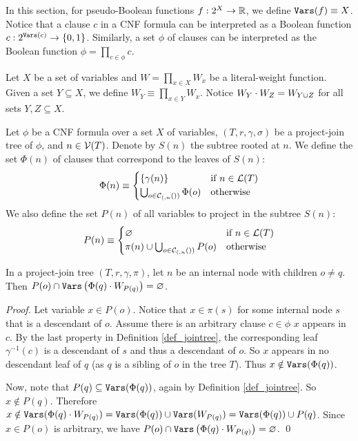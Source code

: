 In this section, for pseudo-Boolean functions $f : 2^X \to \mathbb{R}$, we define $\texttt{\upshape Vars}(f) \equiv X$.
Notice that a clause $c$ in a CNF formula can be interpreted as a Boolean function $c : 2^{\texttt{\upshape Vars}(c)} \to \left\{ 0, 1 \right\}$.
Similarly, a set $\phi$ of clauses can be interpreted as the Boolean function $\phi = \prod_{c \in \phi} c$.

Let $X$ be a set of variables and $W = \prod_{x \in X} W_x$ be a literal-weight function.
Given a set $Y \subseteq X$, we define $W_{Y} \equiv \prod_{x \in Y} W_x$.
Notice $W_Y \cdot W_Z = W_{Y \cup Z}$ for all sets $Y, Z \subseteq X$.

Let $\phi$ be a CNF formula over a set $X$ of variables, $(T, r, \gamma, \sigma)$ be a project-join tree of $\phi$, and $n \in \mathcal{V}(T)$.
Denote by $S(n)$ the subtree rooted at $n$.
We define the set $\Phi(n)$ of clauses that correspond to the leaves of $S(n)$:
\begin{align*}
    \Phi(n) \equiv
    \begin{cases}
        \left\{ \gamma(n) \right\} & \text{if } n \in \mathcal{L}(T) \\
        \bigcup_{o \in \mathcal{C}_{(,n}())} \Phi(o) & \text{otherwise}
    \end{cases}
\end{align*}
We also define the set $P(n)$ of all variables to project in the subtree $S(n)$:
\begin{align*}
    P(n) \equiv
    \begin{cases}
       \varnothing & \text{if } n \in \mathcal{L}(T) \\
        \pi(n) \cup \bigcup_{o \in \mathcal{C}_{(,n}())} P(o) & \text{otherwise}
    \end{cases}
\end{align*}

\begin{lemma}
\label{lemma_disjoint_P}
    In a project-join tree $(T, r, \gamma, \pi)$, let $n$ be an internal node with children $o \ne q$.
    Then $P(o) \cap \texttt{\upshape Vars} \left( \Phi(q) \cdot W_{P(q)} \right) = \varnothing$.
\end{lemma}
\begin{proof}
    Let variable $x \in P(o)$.
    Notice that $x \in \pi(s)$ for some internal node $s$ that is a descendant of $o$.
    Assume there is an arbitrary clause $c \in \phi$ \st{} $x$ appears in $c$.
    By the last property in Definition \ref{def_jointree}, the corresponding leaf $\gamma^{-1}(c)$ is a descendant of $s$ and thus a descendant of $o$.
    So $x$ appears in no descendant leaf of $q$ (as $q$ is a sibling of $o$ in the tree $T$).
    Thus $x \notin \texttt{\upshape Vars}(\Phi(q))$.

    Now, note that $P(q) \subseteq \texttt{\upshape Vars}(\Phi(q))$, again by Definition \ref{def_jointree}.
    So $x \notin P(q)$.
    Therefore $x \notin \texttt{\upshape Vars}(\Phi(q) \cdot W_{P(q)}) = \texttt{\upshape Vars}(\Phi(q)) \cup \texttt{\upshape Vars}(W_{P(q)}) = \texttt{\upshape Vars}(\Phi(q)) \cup P(q)$.
    Since $x \in P(o)$ is arbitrary, we have $P(o) \cap \texttt{\upshape Vars} \left( \Phi(q) \cdot W_{P(q)} \right) = \varnothing$.
\qed
\end{proof}

